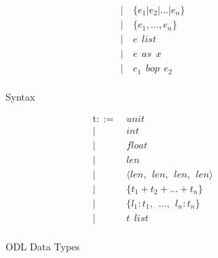 \begin{figure*}[h]
\begin{minipage}{0.45\textwidth}
\begin{align*}
|~& \{e_1 | e_2 | ... | e_n\} \tag{union}\label{syntax:union}\\
|~& \{e_1, ..., e_n\} \tag{struct}\label{syntax:struct}\\
|~& e ~~ list \tag{list}\label{syntax:list}\\
|~& e ~~ as ~~ x \tag{blinding}\label{syntax:blinding}\\
|~& e_1 ~~ bop ~~ e_2 \tag{binary operation}\label{syntax:bop}\\
\end{align*}

\caption{Syntax}
\label{fig:syntax}
\end{minipage}
\hfill
\begin{minipage}{0.45\textwidth}
\begin{align*}
\text{t}::=~&unit\\
|~&int\\
|~&float\\
|~&len\\
|~&\langle len, ~~ len, ~~ len, ~~ len\rangle\\
|~&\{t_1 + t_2 + ... + t_n\}\\
|~&\{l_1 : t_1, ~~ ..., ~~ l_n : t_n\}\\
|~&t ~~ list\\
\end{align*}

\caption{ODL Data Types}\label{fig:type}

\end{minipage}

\end{figure*}





